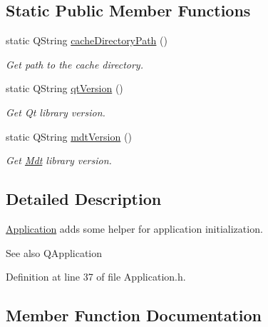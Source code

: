 \subsection*{Static Public Member Functions}
\begin{DoxyCompactItemize}
\item 
static Q\+String \hyperlink{class_mdt_1_1_application_ac78756faf1b2c36c4f4f11334c3f8516}{cache\+Directory\+Path} ()
\begin{DoxyCompactList}\small\item\em Get path to the cache directory. \end{DoxyCompactList}\item 
static Q\+String \hyperlink{class_mdt_1_1_application_ac2842431a2fa3fb63345d99e8943baa0}{qt\+Version} ()\hypertarget{class_mdt_1_1_application_ac2842431a2fa3fb63345d99e8943baa0}{}\label{class_mdt_1_1_application_ac2842431a2fa3fb63345d99e8943baa0}

\begin{DoxyCompactList}\small\item\em Get Qt library version. \end{DoxyCompactList}\item 
static Q\+String \hyperlink{class_mdt_1_1_application_a818de2899b8aad3623e4fe46245f82e6}{mdt\+Version} ()\hypertarget{class_mdt_1_1_application_a818de2899b8aad3623e4fe46245f82e6}{}\label{class_mdt_1_1_application_a818de2899b8aad3623e4fe46245f82e6}

\begin{DoxyCompactList}\small\item\em Get \hyperlink{namespace_mdt}{Mdt} library version. \end{DoxyCompactList}\end{DoxyCompactItemize}


\subsection{Detailed Description}
\hyperlink{class_mdt_1_1_application}{Application} adds some helper for application initialization. 

\begin{DoxySeeAlso}{See also}
Q\+Application 
\end{DoxySeeAlso}


Definition at line 37 of file Application.\+h.



\subsection{Member Function Documentation}
